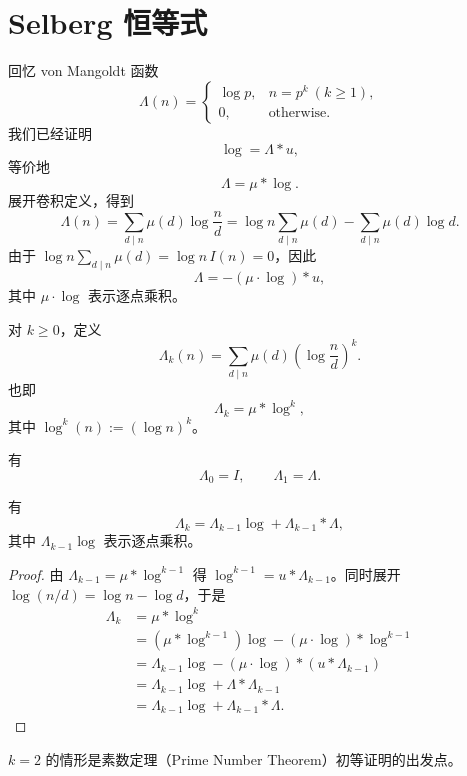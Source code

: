 \section{Selberg 恒等式}

回忆 von Mangoldt 函数
\[
	\Lambda(n)=
	\begin{cases}
		\log p, & n=p^k\ (k\geq 1),\\
		0, & \text{otherwise}.
	\end{cases}
\]
我们已经证明
\[
	\log=\Lambda*u,
\]
等价地
\[
	\Lambda=\mu*\log.
\]
展开卷积定义，得到
\[
	\Lambda(n)
	=
	\sum_{d\mid n}\mu(d)\log\frac nd
	=
	\log n\sum_{d\mid n}\mu(d)
	-\sum_{d\mid n}\mu(d)\log d.
\]
由于 $\log n\sum_{d\mid n}\mu(d)=\log n\,I(n)=0$，因此
\[
	\Lambda=-(\mu\cdot\log)*u,
\]
其中 $\mu\cdot\log$ 表示逐点乘积。

\begin{definition}
	对 $k\geq 0$，定义
	\[
		\Lambda_k(n)
		=
		\sum_{d\mid n}\mu(d)\left(\log\frac nd\right)^k.
	\]
	也即
	\[
		\Lambda_k=\mu*\log^k,
	\]
	其中 $\log^k(n):=(\log n)^k$。
\end{definition}

\begin{remark}
	有
	\[
		\Lambda_0=I,\qquad \Lambda_1=\Lambda.
	\]
\end{remark}

\begin{theorem}
	有
	\[
		\Lambda_k
		=
		\Lambda_{k-1}\log+\Lambda_{k-1}*\Lambda,
	\]
	其中 $\Lambda_{k-1}\log$ 表示逐点乘积。
\end{theorem}

\begin{proof}
	由 $\Lambda_{k-1}=\mu*\log^{k-1}$ 得 $\log^{k-1}=u*\Lambda_{k-1}$。同时展开 $\log(n/d)=\log n-\log d$，于是
	\begin{align*}
		\Lambda_k
		&=\mu*\log^k\\
		&=(\mu*\log^{k-1})\log-(\mu\cdot\log)*\log^{k-1}\\
		&=\Lambda_{k-1}\log-(\mu\cdot\log)*(u*\Lambda_{k-1})\\
		&=\Lambda_{k-1}\log+\Lambda*\Lambda_{k-1}\\
		&=\Lambda_{k-1}\log+\Lambda_{k-1}*\Lambda.
	\end{align*}
\end{proof}

\begin{remark}
	$k=2$ 的情形是素数定理（Prime Number Theorem）初等证明的出发点。
\end{remark}

